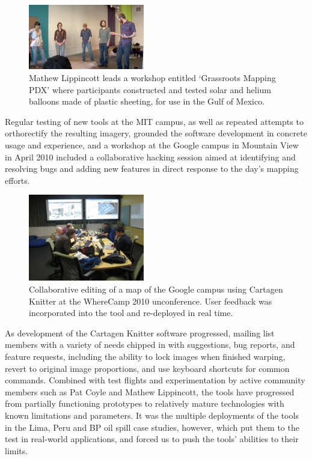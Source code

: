 \documentclass[11pt,oneside,notitlepage]{report}
\begin{document}
\begin{figure}
	\begin{flushright}
		\includegraphics[width=0.45\textwidth]{images/lippincott-workshop.png}
		\caption{Mathew Lippincott leads a workshop entitled `Grassroots Mapping PDX' where participants constructed and tested solar and helium balloons made of plastic sheeting, for use in the Gulf of Mexico.}
	\end{flushright}
\end{figure}

Regular testing of new tools at the MIT campus, as well as repeated attempts to orthorectify the resulting imagery, grounded the software development in concrete usage and experience, and a workshop at the Google campus in Mountain View in April 2010 included a collaborative hacking session aimed at identifying and resolving bugs and adding new features in direct response to the day's mapping efforts. 

\begin{figure}
	\begin{flushright}
		\includegraphics[width=0.45\textwidth]{images/asynchronous-editing.jpg}
		\caption{Collaborative editing of a map of the Google campus using Cartagen Knitter at the WhereCamp 2010 unconference. User feedback was incorporated into the tool and re-deployed in real time.}
	\end{flushright}
\end{figure}

As development of the Cartagen Knitter software progressed, mailing list members with a variety of needs chipped in with suggestions, bug reports, and feature requests, including the ability to lock images when finished warping, revert to original image proportions, and use keyboard shortcuts for common commands. Combined with test flights and experimentation by active community members such as Pat Coyle and Mathew Lippincott, the tools have progressed from partially functioning prototypes to relatively mature technologies with known limitations and parameters. It was the multiple deployments of the tools in the Lima, Peru and BP oil spill case studies, however, which put them to the test in real-world applications, and forced us to push the tools' abilities to their limits. 
\end{document}
